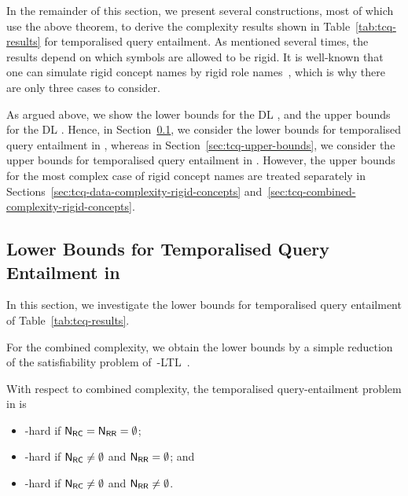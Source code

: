 \noindent
In the remainder of this section, we  present several constructions, most
of which use the above theorem, to derive the complexity results shown in
Table~\ref{tab:tcq-results} for temporalised query entailment.
%
As mentioned several times, the results depend on which symbols are allowed to
be rigid.  It is well-known that one can simulate rigid concept names by rigid
role names~\cite{BaGL-ToCL12}, which is why there are only three cases to
consider.

As argued above, we show the lower bounds for the DL \ALC, and the upper bounds
for the DL \SHQ.
%
Hence, in Section~\ref{sec:tcq-lower-bounds}, we consider the lower bounds for
temporalised query entailment in \ALC, whereas in
Section~\ref{sec:tcq-upper-bounds}, we consider the upper bounds for
temporalised query entailment in \SHQ.  However, the upper bounds for the most
complex case of rigid concept names are treated separately in
Sections~\ref{sec:tcq-data-complexity-rigid-concepts}
and~\ref{sec:tcq-combined-complexity-rigid-concepts}.


\subsection{Lower Bounds for Temporalised Query Entailment in~\texorpdfstring{\ALC}{ALC}}\label{sec:tcq-lower-bounds}

In this section, we investigate the lower bounds for temporalised query
entailment of Table~\ref{tab:tcq-results}.

For the combined complexity, we obtain the lower bounds by a simple reduction of
the satisfiability problem of~\ALC-LTL~\cite{BaGL-ToCL12}.

\begin{theorem}\label{thm:lower-bounds-combined-complexity}
    With respect to combined complexity, the temporalised query-entailment
    problem in \ALC is
    \begin{itemize}
        \item \ExpTime-hard if $\mathsf{N_{RC}}=\mathsf{N_{RR}}=\emptyset$;
        \item \coNExpTime-hard if $\mathsf{N_{RC}}\ne\emptyset$ and $\mathsf{N_{RR}}=\emptyset$; and
        \item \TwoExpTime-hard if $\mathsf{N_{RC}}\ne\emptyset$ and $\mathsf{N_{RR}}\ne\emptyset$.
    \end{itemize}
\end{theorem}

